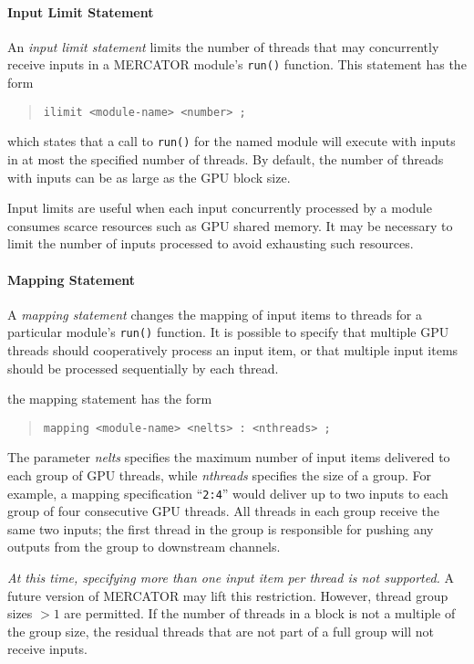 \documentclass[11pt]{article}
\begin{document}
\paragraph*{Input Limit Statement}
An \emph{input limit statement} limits the number of threads that
may concurrently receive inputs in a MERCATOR module's \texttt{run()}
function.  This statement has the form
\begin{quote}
\texttt{ilimit <module-name> <number> ;}
\end{quote}
which states that a call to \texttt{run()} for the named module will
execute with inputs in at most the specified number of threads.  By
default, the number of threads with inputs can be as large as the
GPU block size.

Input limits are useful when each input concurrently processed by
a module consumes scarce resources such as GPU shared memory.  It
may be necessary to limit the number of inputs processed to avoid
exhausting such resources.

\paragraph*{Mapping Statement}
A \emph{mapping statement} changes the mapping of input items to
threads for a particular module's \texttt{run()} function.  It is
possible to specify that multiple GPU threads should cooperatively
process an input item, or that multiple input items should be
processed sequentially by each thread.

the mapping statement has the form

\begin{quote}
\texttt{mapping <module-name> <nelts> :~<nthreads> ;}
\end{quote}

The parameter \textit{nelts} specifies the maximum number of input items
delivered to each group of GPU threads, while \textit{nthreads} specifies the
size of a group.  For example, a mapping specification
``\texttt{2:4}'' would deliver up to two inputs to each group of four
consecutive GPU threads.  All threads in each group receive the same
two inputs; the first thread in the group is responsible for pushing
any outputs from the group to downstream channels.

\emph{At this time, specifying more than one input item per thread is not
supported.}  A future version of MERCATOR may lift this restriction.
However, thread group sizes $> 1$ are permitted.  If the number of threads
in a block is not a multiple of the group size, the residual threads that
are not part of a full group will not receive inputs.
\end{document}
